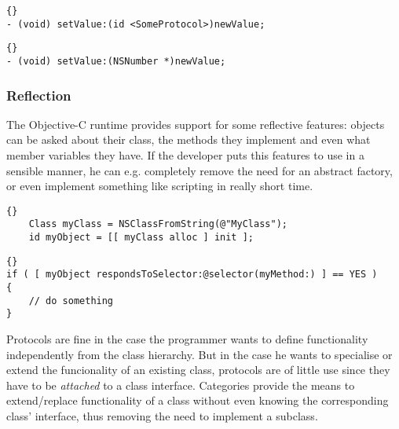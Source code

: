 \begin{lstlisting}[captionpos=b, caption=Argument with protocol type
information.,
label=lst_objctypesprotocolinfo]{}
- (void) setValue:(id <SomeProtocol>)newValue;
\end{lstlisting}

\begin{lstlisting}[captionpos=b, caption=Argument with class type information.,
label=lst_objctypesclasslinfo]{}
- (void) setValue:(NSNumber *)newValue;
\end{lstlisting}

\subsubsection{Reflection}
The Objective-C runtime provides support for some reflective features: objects
can be asked about their class, the methods they implement and even what member
variables they have. If the developer puts this features to use in a sensible
manner, he can e.g. completely remove the need for an abstract factory, or even
implement something like scripting in really short time.

\begin{lstlisting}[captionpos=b, caption=Argument with class type information.,
label=lst_objcclassfromstring, morekeywords={Class}]{}
    Class myClass = NSClassFromString(@"MyClass");
    id myObject = [[ myClass alloc ] init ];
\end{lstlisting}

\begin{lstlisting}[captionpos=b, caption=Argument with class type information.,
label=lst_objcinstancerespindstoselector]{}
if ( [ myObject respondsToSelector:@selector(myMethod:) ] == YES )
{
    // do something
}
\end{lstlisting}

Protocols are fine in the case the programmer wants to define functionality
independently from the class hierarchy. But in the case he wants to specialise
or extend the funcionality of an existing class, protocols are of little use
since they have to be \textit{attached} to a class interface. Categories
provide the means to extend/replace functionality of a class without even
knowing the corresponding class' interface, thus removing the need to
implement a subclass.

